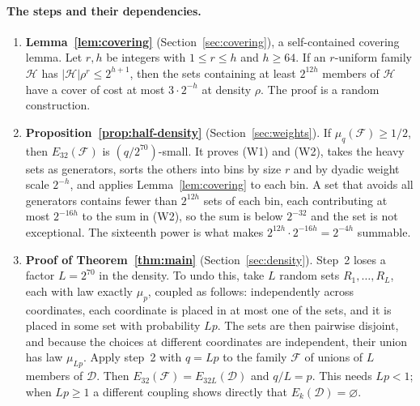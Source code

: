 \documentclass[11pt,letterpaper]{article}
\theoremstyle{definition}
\theoremstyle{remark}
\numberwithin{equation}{section}
\begin{document}
\paragraph{The steps and their dependencies.}
\begin{enumerate}
\item \textbf{Lemma~\ref{lem:covering}} (Section~\ref{sec:covering}),
a self-contained covering lemma. Let $r,h$ be integers with
$1\le r\le h$ and $h\ge64$. If an $r$-uniform family $\mathcal H$ has
$|\mathcal H|\rho^r\le2^{h+1}$, then the sets containing at least $2^{12h}$
members of $\mathcal H$ have a cover of cost at most $3\cdot2^{-h}$ at
density $\rho$. The proof is a random construction.
\item \textbf{Proposition~\ref{prop:half-density}}
(Section~\ref{sec:weights}). If $\mu_q(\mathcal F)\ge1/2$, then
$E_{32}(\mathcal F)$ is $(q/2^{70})$-small. It proves (W1) and (W2), takes
the heavy sets as generators, sorts the others into bins by size $r$ and by
dyadic weight scale $2^{-h}$, and applies Lemma~\ref{lem:covering} to each
bin. A set that avoids all generators contains fewer than $2^{12h}$ sets of
each bin, each contributing at most $2^{-16h}$ to the sum in (W2), so the
sum is below $2^{-32}$ and the set is not exceptional. The sixteenth power
is what makes $2^{12h}\cdot2^{-16h}=2^{-4h}$ summable.
\item \textbf{Proof of Theorem~\ref{thm:main}} (Section~\ref{sec:density}).
Step~2 loses a factor $L=2^{70}$ in the density. To undo this, take
$L$ random sets $R_1,\ldots,R_L$, each with law exactly $\mu_p$, coupled
as follows: independently across coordinates, each coordinate is placed
in at most one of the sets, and it is placed in some set with probability
$Lp$. The sets are then pairwise disjoint, and because the choices at
different coordinates are independent, their union has law $\mu_{Lp}$.
Apply step~2 with $q=Lp$ to the family $\mathcal F$ of unions of $L$
members of $\mathcal D$. Then $E_{32}(\mathcal F)=E_{32L}(\mathcal D)$ and
$q/L=p$. This needs $Lp<1$; when $Lp\ge1$ a different coupling shows
directly that $E_k(\mathcal D)=\varnothing$.
\end{enumerate}
\end{document}
